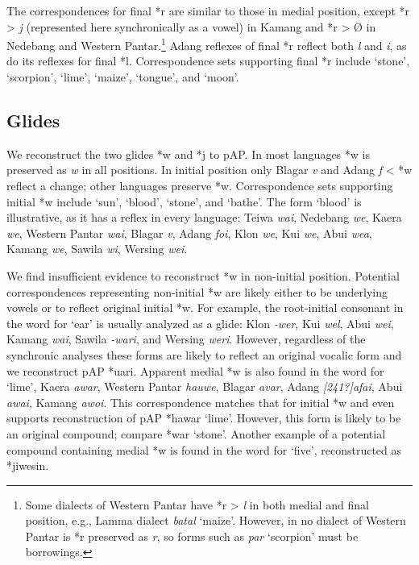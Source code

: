  The correspondences for final *r are similar to those in medial position, except *r {\textgreater} \textit{j} (represented here synchronically as a vowel) in Kamang and *r {\textgreater} {\O} in Nedebang and Western Pantar.\footnote{ Some dialects of Western Pantar have *r {\textgreater} \textit{l} in both medial and final position, e.g., Lamma dialect \textit{bat{\textlengthmark}al }`maize'. However, in no dialect of Western Pantar is *r preserved as \textit{r}, so forms such as \textit{par} `scorpion' must be borrowings.} Adang reflexes of final *r reflect both \textit{l} and \textit{i}, as do its reflexes for final *l. Correspondence sets supporting final *r include `stone', `scorpion', `lime', `maize', `tongue', and `moon'.

\subsection{ Glides}
We reconstruct the two glides *w and *j to pAP. In most languages *w is preserved as \textit{w} in all positions. In initial position only Blagar \textit{v} and Adang \textit{f} {\textless} *w reflect a change; other languages preserve *w. Correspondence sets supporting initial *w include `sun', `blood', `stone', and `bathe'. The form `blood' is illustrative, as it has a reflex in every language: Teiwa \textit{wai}, Nedebang \textit{we}, Kaera \textit{we}, Western Pantar \textit{wai}, Blagar \textit{v{\textepsilon}}, Adang \textit{foi}, Klon \textit{we{\textglotstop}}, Kui \textit{we}, Abui \textit{wea}, Kamang \textit{we{\textlengthmark}}, Sawila \textit{wi{\textlengthmark}}, Wersing \textit{wei}.

We find insufficient evidence to reconstruct *w in non-initial position. Potential correspondences representing non-initial *w are likely either to be underlying vowels or to reflect original initial *w. For example, the root-initial consonant in the word for `ear' is usually analyzed as a glide: Klon \textit{{}-wer}, Kui \textit{wel}, Abui \textit{wei}, Kamang \textit{wai}, Sawila \textit{{}-wari}, and Wersing \textit{weri}. However, regardless of the synchronic analyses these forms are likely to reflect an original vocalic form and we reconstruct pAP *uari. Apparent medial *w is also found in the word for `lime', Kaera \textit{awar}, Western Pantar \textit{hauwe}, Blagar \textit{avar}, Adang\textit{ [241?]afai}, Abui \textit{awai}, Kamang \textit{awoi}. This correspondence matches that for initial *w and even supports reconstruction of pAP *hawar `lime'. However, this form is likely to be an original compound; compare *war `stone'. Another example of a potential compound containing medial *w is found in
the word for `five', reconstructed as *jiwesin.

